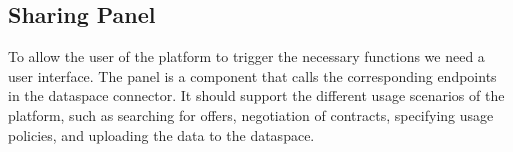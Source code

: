 \documentclass{article}
\begin{document}
\subsection{Sharing Panel} 
To allow the user of the platform to trigger the necessary functions we need a user interface. The panel is a component that calls the corresponding endpoints in the dataspace connector. It should support the different usage scenarios of the platform, such as searching for offers, negotiation of contracts, specifying usage policies, and uploading the data to the dataspace.

\end{document}
